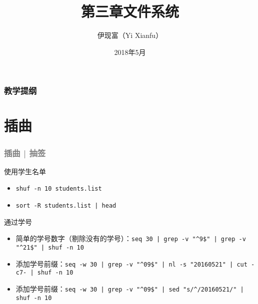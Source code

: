 



\title[文件系统]{第三章\quad 文件系统}
\author[Yixf]{伊现富（Yi Xianfu）}
\date{2018年5月}


\begin{frame}
  \titlepage
\end{frame}

\begin{frame}[plain,label=current]
  \frametitle{教学提纲}
  \setcounter{tocdepth}{3}
  \begin{multicols}{2}
    \tableofcontents
  \end{multicols}
\end{frame}

\section{插曲}
\begin{frame}[fragile]
  \frametitle{\textcolor{gray}{插曲 | 抽签}}
  \begin{block}{使用学生名单}
    \begin{itemize}
      \item \verb=shuf -n 10 students.list=
      \item \verb=sort -R students.list | head=
    \end{itemize}
  \end{block}
  \pause
  \begin{block}{通过学号}
    \begin{itemize}
      \item 简单的学号数字（剔除没有的学号）：\verb=seq 30 | grep -v "^9$" | grep -v "^21$" | shuf -n 10=
      \item 添加学号前缀：\verb=seq -w 30 | grep -v "^09$" | nl -s "20160521" | cut -c7- | shuf -n 10=
      \item 添加学号前缀：\verb=seq -w 30 | grep -v "^09$" | sed "s/^/20160521/" | shuf -n 10=
    \end{itemize}
  \end{block}
\end{frame}

